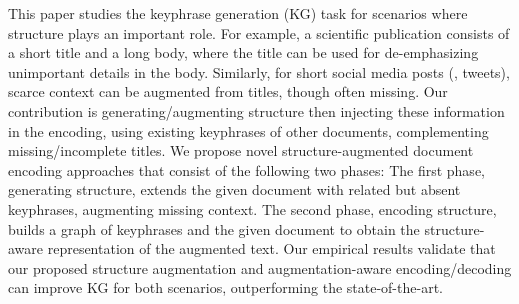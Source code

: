 This paper studies the keyphrase generation (KG) task for scenarios where structure plays an important role. For example, a scientific publication consists of a short title and a long body, where the title can be used for de-emphasizing unimportant details in the body. Similarly, for short social media posts (\eg, tweets), scarce context can be augmented from titles, though often missing. Our contribution is generating/augmenting structure then injecting these information in the encoding, using existing keyphrases of other documents, complementing missing/incomplete titles. We propose novel structure-augmented document encoding approaches that consist of the following two phases: The first phase, generating structure, extends the given document with related but absent keyphrases, augmenting missing context. The second phase, encoding structure, builds a graph of keyphrases and the given document to obtain the structure-aware representation of the augmented text. Our empirical results validate that our proposed structure augmentation and augmentation-aware encoding/decoding can improve KG for both scenarios, outperforming the state-of-the-art.
